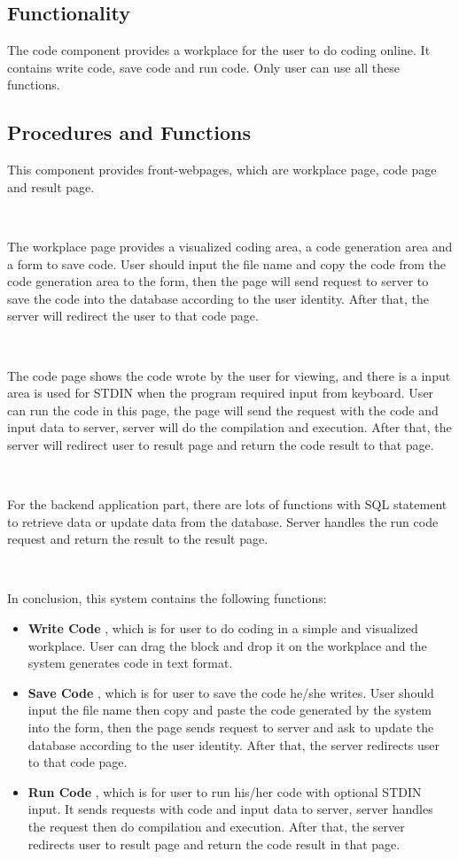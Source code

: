 \subsection{Functionality}
The code component provides a workplace for the user to do coding online. It contains write code, save code and run code. Only user can use all these functions.

\subsection{Procedures and Functions}
This component provides front-webpages, which are workplace page, code page and result page.

~

The workplace page provides a visualized coding area, a code generation area and a form to save code. User should input the file name and copy the code from the code generation area to the form, then the page will send request to server to save the code into the database according to the user identity. After that, the server will redirect the user to that code page.

~

The code page shows the code wrote by the user for viewing, and there is a input area is used for STDIN when the program required input from keyboard. User can run the code in this page, the page will send the request with the code and input data to server, server will do the compilation and execution. After that, the server will redirect user to result page and return the code result to that page.

~

For the backend application part, there are lots of functions with SQL statement to retrieve data or update data from the database. Server handles the run code request and return the result to the result page.

~

In conclusion, this system contains the following functions:

\begin{itemize}

\item
\textbf{Write Code}
, which is for user to do coding in a simple and visualized workplace. User can drag the block and drop it on the workplace and the system generates code in text format.\newline

\item
\textbf{Save Code}
, which is for user to save the code he/she writes. User should input the file name then copy and paste the code generated by the system into the form, then the page sends request to server and ask to update the database according to the user identity. After that, the server redirects user to that code page.

\item
\textbf{Run Code}
, which is for user to run his/her code with optional STDIN input. It sends requests with code and input data to server, server handles the request then do compilation and execution. After that, the server redirects user to result page and return the code result in that page.

\end{itemize}
